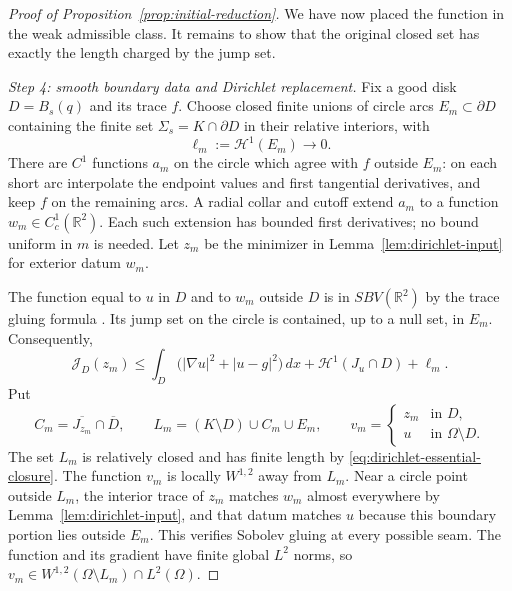 \begin{proof}[Proof of Proposition~\ref{prop:initial-reduction}]
We have now placed the function in the weak admissible class.
It remains to show that the original closed set has exactly the
length charged by the jump set.

\smallskip
\noindent\emph{Step 4: smooth boundary data and Dirichlet replacement.}
Fix a good disk $D=B_s(q)$ and its trace $f$.
Choose closed finite unions of circle arcs
$E_m\subset\partial D$ containing the finite set
$\Sigma_s=K\cap\partial D$ in their relative interiors, with
\[
 \ell_m:=\mathcal H^1(E_m)\longrightarrow0.
\]
There are $C^1$ functions $a_m$ on the circle which agree with
$f$ outside $E_m$: on each short arc interpolate the endpoint
values and first tangential derivatives, and keep $f$ on the
remaining arcs.  A radial collar and cutoff extend $a_m$ to a
function $w_m\in C^1_c(\mathbb R^2)$.
Each such extension has bounded first derivatives; no bound
uniform in $m$ is needed.
Let $z_m$ be the minimizer in
Lemma~\ref{lem:dirichlet-input} for exterior datum $w_m$.

The function equal to $u$ in $D$ and to $w_m$ outside $D$ is in
$SBV(\mathbb R^2)$ by the trace gluing formula
\cite[Theorems~3.84 and~3.87, Corollary~3.89]{ambrosio_fusco_pallara2000}.
Its jump set on the circle is contained, up to a null set, in
$E_m$.  Consequently,
\begin{equation}
 \mathcal J_D(z_m)
 \le \int_D\bigl(|\nabla u|^2+|u-g|^2\bigr)\,dx
       +\mathcal H^1(J_u\cap D)+\ell_m.
 \label{eq:dirichlet-replacement-bound}
\end{equation}
Put
\[
 C_m=\overline{J_{z_m}}\cap\overline D,
 \qquad
 L_m=(K\setminus D)\cup C_m\cup E_m,
 \qquad
 v_m=\begin{cases}z_m&\text{in }D,\\u&\text{in }\Omega\setminus D.
       \end{cases}
\]
The set $L_m$ is relatively closed and has finite length by
\eqref{eq:dirichlet-essential-closure}.
The function $v_m$ is locally $W^{1,2}$ away from $L_m$.
Near a circle point outside $L_m$, the interior trace of $z_m$
matches $w_m$ almost everywhere by Lemma~\ref{lem:dirichlet-input},
and that datum matches $u$ because this boundary portion lies
outside $E_m$.
This verifies Sobolev gluing at every possible seam.
The function and its gradient have finite global $L^2$ norms,
so $v_m\in W^{1,2}(\Omega\setminus L_m)\cap L^2(\Omega)$.


\end{proof}
